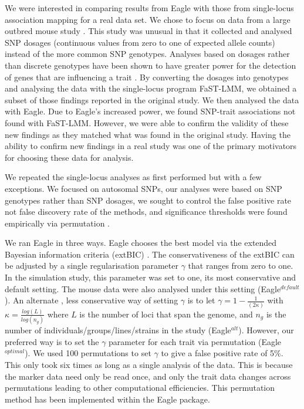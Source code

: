 \documentclass{article}
\begin{document}
We were interested in comparing results from Eagle with those from single-locus association mapping for a real data set.
 We chose to focus on data from a large outbred mouse study \citep{nicod2016genome}. This study was unusual in that it collected and analysed SNP dosages (continuous values from zero to one of expected allele counts)  instead of the more common SNP genotypes. Analyses based on dosages rather than discrete genotypes have been shown to have greater power for the detection of genes that are influencing a trait  \citep{zheng2011comparison}. By converting the dosages into genotypes and analysing the data with the single-locus program FaST-LMM, we obtained a subset of those findings reported in the original study. We then analysed the data with Eagle. Due to Eagle's increased power, we found SNP-trait associations not found with  FaST-LMM. However, we were 
 able to confirm the validity of these new findings as they matched what was found in the original study. Having the ability to confirm new findings  in a real study was 
 one of the primary motivators for choosing these data for analysis. 

We repeated the single-locus analyses as first performed \citep{nicod2016genome} but with a few exceptions. We 
focused on autosomal SNPs, our analyses were based on SNP genotypes  rather than SNP dosages, 
we sought to control the false positive rate not false discovery rate of the methods, and significance thresholds were 
found empirically via permutation \citep{doerge1996permutation}.


We ran Eagle in three ways. 
Eagle chooses the best model via the extended Bayesian information criteria (extBIC) \citep{chen2008extended}. 
  The conservativeness of the extBIC can be adjusted by a single regularisation parameter  $\gamma$ that ranges from zero to one. 
In the simulation study, this parameter was set to one, its most conservative and default setting. The mouse data were also analysed 
under this setting (Eagle$^{default}$).  An alternate  \citep{chen2008extended} , less conservative way of setting $\gamma$ is to  let $\gamma = 1 - \frac{1}{(2\kappa)}$ with $\kappa=\frac{log(L)}{log(n_g)}$ where 
 $L$ is the number of loci that span the genome, and $n_g$ is the number of individuals/groups/lines/strains in the study
  (Eagle$^{alt}$). However, our preferred way is to set the $\gamma$ parameter for each trait via permutation (Eagle$^{optimal}$).  We used 100 permutations to set $\gamma$ to give a false  positive rate of 5\%.  This only took six times as long as a single analysis of the data. This is because the marker data need only be read  once, 
 and only the trait data changes across permutations leading to other computational efficiencies.  
  This permutation method has been implemented within the
 Eagle package. 
  
\end{document}
